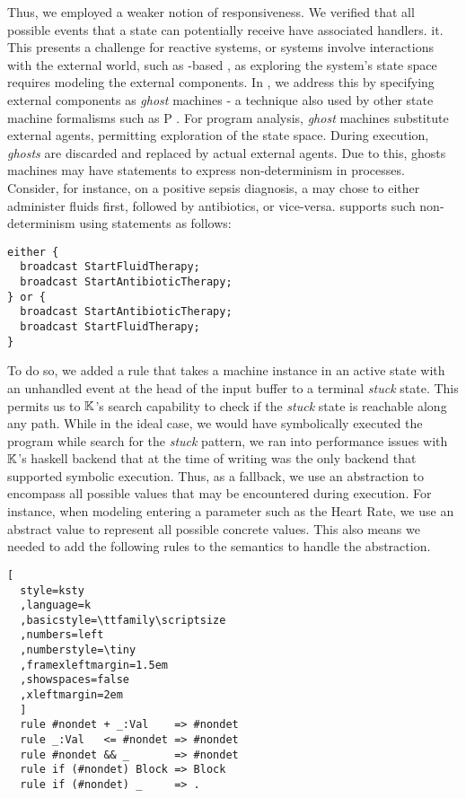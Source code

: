 Thus, we employed a weaker notion of responsiveness. We verified that all
possible events that a state can potentially receive have associated handlers.
it. This presents a challenge for reactive systems, or systems involve interactions
with the external world, such as \MediK{}-based \CDSSs, as exploring
the system's state space requires modeling the external components.
In \MediK{}, we address this by specifying external components
as \emph{ghost} machines - a technique also used by other state machine
formalisms such as P \cite{DesaiPLDI13}.
For program analysis, \emph{ghost} machines substitute external agents,
permitting exploration of the state space.
During execution, \emph{ghosts} are discarded and replaced by actual external agents.
Due to this, ghosts machines may have statements to express non-determinism
in processes. Consider, for instance, on a positive sepsis diagnosis, a
\HCP{} may chose to either administer fluids first, followed by antibiotics, or
vice-versa. \MediK{} supports such non-determinism using 
statements as follows:
\begin{lstlisting}[style=mediksty
,language=medik
,basicstyle=\ttfamily\scriptsize
,numberstyle=\tiny
,framexleftmargin=1.5em
,xleftmargin=2em
]
either {
  broadcast StartFluidTherapy;
  broadcast StartAntibioticTherapy;
} or {
  broadcast StartAntibioticTherapy;
  broadcast StartFluidTherapy;
}
\end{lstlisting}

To do so, we added a rule that takes a machine instance in an active state
with an unhandled event at the head of the input buffer to a terminal \emph{stuck}
state. This permits us to $\mathbb{K}$'s search capability to check if the \emph{stuck}
state is reachable along any path.
While in the ideal case, we would have symbolically executed the program while
search for the \emph{stuck} pattern, we ran into performance issues
with $\mathbb{K}$'s haskell backend that at the time of writing was the only backend
that supported symbolic execution. Thus, as a fallback, we
use an abstraction to
encompass all possible values that may be encountered during execution.
For instance, when modeling entering a parameter such as the Heart Rate,
we use an abstract value to represent all possible concrete values.
This also means we needed to add the following rules to the semantics to
handle the abstraction.
\begin{lstlisting}[
  style=ksty
  ,language=k
  ,basicstyle=\ttfamily\scriptsize
  ,numbers=left
  ,numberstyle=\tiny
  ,framexleftmargin=1.5em
  ,showspaces=false
  ,xleftmargin=2em
  ]
  rule #nondet + _:Val    => #nondet
  rule _:Val   <= #nondet => #nondet
  rule #nondet && _       => #nondet
  rule if (#nondet) Block => Block
  rule if (#nondet) _     => .
\end{lstlisting}

